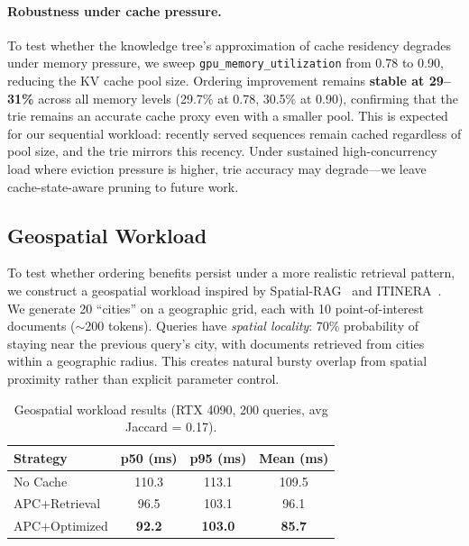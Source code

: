 \documentclass{article}
\begin{document}
\paragraph{Robustness under cache pressure.}
To test whether the knowledge tree's approximation of cache residency degrades under memory pressure, we sweep \texttt{gpu\_memory\_utilization} from 0.78 to 0.90, reducing the KV cache pool size. Ordering improvement remains \textbf{stable at 29--31\%} across all memory levels (29.7\% at 0.78, 30.5\% at 0.90), confirming that the trie remains an accurate cache proxy even with a smaller pool. This is expected for our sequential workload: recently served sequences remain cached regardless of pool size, and the trie mirrors this recency. Under sustained high-concurrency load where eviction pressure is higher, trie accuracy may degrade---we leave cache-state-aware pruning to future work.

\subsection{Geospatial Workload}
\label{sec:spatial}

To test whether ordering benefits persist under a more realistic retrieval pattern, we construct a geospatial workload inspired by Spatial-RAG~\citep{yu2025spatialrag} and ITINERA~\citep{tang2024itinera}. We generate 20 ``cities'' on a geographic grid, each with 10 point-of-interest documents (${\sim}200$ tokens). Queries have \emph{spatial locality}: 70\% probability of staying near the previous query's city, with documents retrieved from cities within a geographic radius. This creates natural bursty overlap from spatial proximity rather than explicit parameter control.

\begin{table}[t]
\caption{Geospatial workload results (RTX 4090, 200 queries, avg Jaccard = 0.17).}
\label{tab:spatial}
\centering
\small
\begin{tabular}{@{}lccc@{}}
\toprule
\textbf{Strategy} & \textbf{p50 (ms)} & \textbf{p95 (ms)} & \textbf{Mean (ms)} \\
\midrule
No Cache      & 110.3 & 113.1 & 109.5 \\
APC+Retrieval & 96.5  & 103.1 & 96.1  \\
APC+Optimized & \textbf{92.2} & \textbf{103.0} & \textbf{85.7} \\
\bottomrule
\end{tabular}
\vspace{-0.5em}
\end{table}
\end{document}
